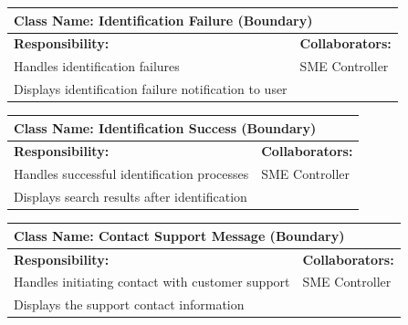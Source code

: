 \documentclass[]{article}
\begin{document}
\begin{table}[H]
    \centering
    \begin{tabular}{|p{}|p{}|}
        \hline
        \multicolumn{2}{|l|}{\textbf{Class Name:} Identification Failure (Boundary)} \\
        \hline
        \textbf{Responsibility:} & \textbf{Collaborators:} \\
        \hline
        Handles identification failures & SME Controller \\
        Displays identification failure notification to user & \\
        \hline
    \end{tabular}
    \label{tab:identification_failure}
\end{table}

\begin{table}[H]
    \centering
    \begin{tabular}{|p{}|p{}|}
        \hline
        \multicolumn{2}{|l|}{\textbf{Class Name:} Identification Success (Boundary)} \\
        \hline
        \textbf{Responsibility:} & \textbf{Collaborators:} \\
        \hline
        Handles successful identification processes & SME Controller \\
        Displays search results after identification & \\
        \hline
    \end{tabular}
    \label{tab:identification_success}
\end{table}

\begin{table}[H]
    \centering
    \begin{tabular}{|p{}|p{}|}
        \hline
        \multicolumn{2}{|l|}{\textbf{Class Name:} Contact Support Message (Boundary)} \\
        \hline
        \textbf{Responsibility:} & \textbf{Collaborators:} \\
        \hline
        Handles initiating contact with customer support & SME Controller \\
        Displays the support contact information &  \\
        \hline
    \end{tabular}
    \label{tab:contact_support_message}
\end{table}
\end{document}
